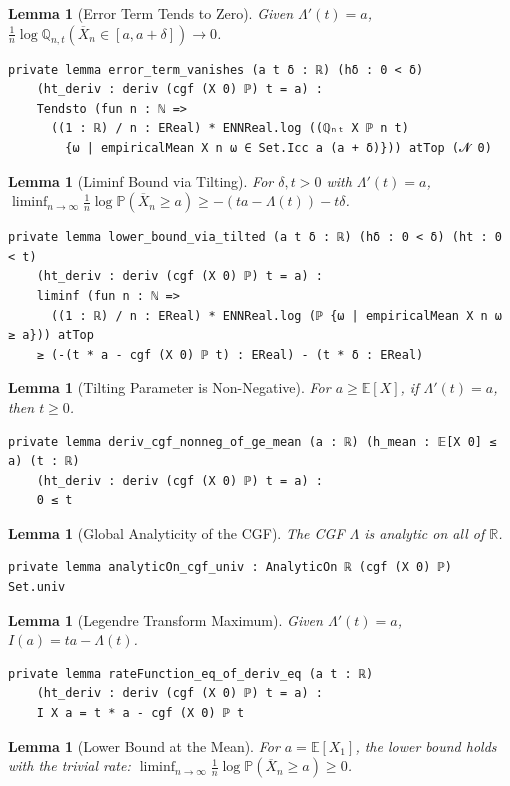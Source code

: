 \documentclass{article}
\newtheorem{lemma}[theorem]{Lemma}
\newcommand{\E}{\mathbb{E}}
\renewcommand{\P}{\mathbb{P}}
\newcommand{\Q}{\mathbb{Q}}
\newcommand{\R}{\mathbb{R}}
\begin{document}
\newpage
\begin{lemma}[Error Term Tends to Zero]
  Given $\Lambda'(t) = a$, $\frac{1}{n} \log \Q_{n,t}(\overline{X}_n \in [a, a+\delta]) \to 0$.
\end{lemma}
\begin{lstlisting}
private lemma error_term_vanishes (a t δ : ℝ) (hδ : 0 < δ)
    (ht_deriv : deriv (cgf (X 0) ℙ) t = a) :
    Tendsto (fun n : ℕ =>
      ((1 : ℝ) / n : EReal) * ENNReal.log ((ℚₙₜ X ℙ n t)
        {ω | empiricalMean X n ω ∈ Set.Icc a (a + δ)})) atTop (𝓝 0)
\end{lstlisting}
\begin{lemma}[Liminf Bound via Tilting]
  For $\delta, t > 0$ with $\Lambda'(t) = a$, $\liminf_{n\to\infty} \frac{1}{n} \log \P(\overline{X}_n \ge a) \ge -(ta - \Lambda(t)) - t\delta$.
\end{lemma}
\begin{lstlisting}
private lemma lower_bound_via_tilted (a t δ : ℝ) (hδ : 0 < δ) (ht : 0 < t)
    (ht_deriv : deriv (cgf (X 0) ℙ) t = a) :
    liminf (fun n : ℕ =>
      ((1 : ℝ) / n : EReal) * ENNReal.log (ℙ {ω | empiricalMean X n ω ≥ a})) atTop
    ≥ (-(t * a - cgf (X 0) ℙ t) : EReal) - (t * δ : EReal)
\end{lstlisting}
\begin{lemma}[Tilting Parameter is Non-Negative]
  For $a \ge \E[X]$, if $\Lambda'(t) = a$, then $t \ge 0$.
\end{lemma}
\begin{lstlisting}
private lemma deriv_cgf_nonneg_of_ge_mean (a : ℝ) (h_mean : 𝔼[X 0] ≤ a) (t : ℝ)
    (ht_deriv : deriv (cgf (X 0) ℙ) t = a) :
    0 ≤ t
\end{lstlisting}
\begin{lemma}[Global Analyticity of the CGF]
  The CGF $\Lambda$ is analytic on all of $\R$.
\end{lemma}
\begin{lstlisting}
private lemma analyticOn_cgf_univ : AnalyticOn ℝ (cgf (X 0) ℙ) Set.univ
\end{lstlisting}
\begin{lemma}[Legendre Transform Maximum]
  Given $\Lambda'(t) = a$, $I(a) = ta - \Lambda(t)$.
\end{lemma}
\begin{lstlisting}
private lemma rateFunction_eq_of_deriv_eq (a t : ℝ)
    (ht_deriv : deriv (cgf (X 0) ℙ) t = a) :
    I X a = t * a - cgf (X 0) ℙ t
\end{lstlisting}
\begin{lemma}[Lower Bound at the Mean]
  For $a = \E[X_1]$, the lower bound holds with the trivial rate: $\liminf_{n\to\infty} \frac{1}{n} \log \P(\overline{X}_n \ge a) \ge 0$.
\end{lemma}
\end{document}

